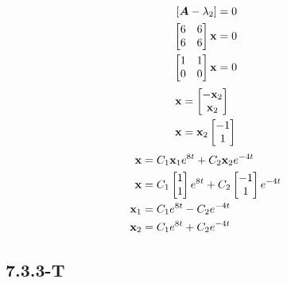 \documentclass{article}
\begin{document}
\begin{align*}
	\left[ \matr{A} - \lambda_2 \right] & = 0 \\
	\begin{bmatrix}
		6 & 6 \\
		6 & 6
	\end{bmatrix} \vect{x} & = 0 \\
	\begin{bmatrix}
		1 & 1 \\
		0 & 0
	\end{bmatrix} \vect{x} & = 0
\end{align*}
\begin{align*}
	\vect{x} & = \begin{bmatrix} -\vect{x}_2 \\ \vect{x}_2 \end{bmatrix} \\
	\vect{x} & = \vect{x}_2 \begin{bmatrix} -1 \\ 1 \end{bmatrix}
\end{align*}
\begin{align*}
	\vect{x} & = C_1 \vect{x}_1 e^{8t} + C_2 \vect{x}_2 e^{-4t} \\
	\vect{x} & =
		C_1 \begin{bmatrix} 1 \\ 1 \end{bmatrix} e^{8t}
		+ C_2 \begin{bmatrix} -1 \\ 1 \end{bmatrix} e^{-4t} \\
	\vect{x}_1 & = C_1e^{8t} - C_2e^{-4t} \\
	\vect{x}_2 & = C_1e^{8t} + C_2e^{-4t}
\end{align*}

\subsection{7.3.3-T}
\end{document}
